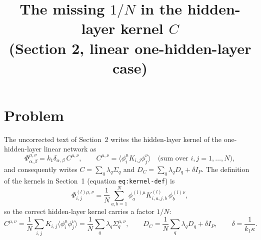 \documentclass[11pt,a4paper]{article}
\title{The missing $1/N$ in the hidden-layer kernel $C$\\(Section 2, linear one-hidden-layer case)}
\author{}
\date{}
\begin{document}
\maketitle

\section{Problem}
The uncorrected text of Section~2 writes the hidden-layer kernel of the one-hidden-layer linear network as
\begin{equation}
  \Phi^{\mu,\nu}_{\alpha,\beta} = k_1 \delta_{\alpha,\beta}\, C^{\mu,\nu},
  \qquad
  C^{\mu,\nu} = \big\langle \phi^\mu_i K_{i,j} \phi^\nu_j \big\rangle
  \quad\text{(sum over } i,j = 1,\dots,N\text{)},
  \label{eq:C-as-written}
\end{equation}
and consequently writes $C = \sum_q \lambda_q \Sigma_q$ and $D_C = \sum_q \lambda_q D_q + \delta I_P$.
The definition of the kernels in Section~1 (equation \texttt{eq:kernel-def}) is
\begin{equation}
  \Phi^{(l)\mu,\nu}_{i,j} = \frac1N \sum_{a,b=1}^N \phi^{(l)\mu}_a K^{(l)}_{i,a,j,b}\, \phi^{(l)\nu}_b ,
\end{equation}
so the correct hidden-layer kernel carries a factor $1/N$:
\begin{equation}
  C^{\mu,\nu} = \frac1N \sum_{i,j} K_{i,j} \big\langle \phi^\mu_i \phi^\nu_j \big\rangle
  = \frac1N \sum_q \lambda_q \Sigma^{\mu,\nu}_q ,
  \qquad
  D_C = \frac1N \sum_q \lambda_q D_q + \delta I_P ,
  \qquad \delta = \frac{1}{k_1\kappa}.
  \label{eq:C-correct}
\end{equation}
\end{document}
